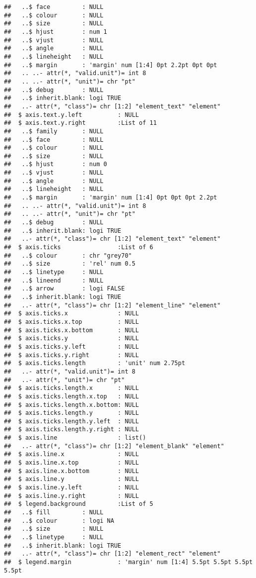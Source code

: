 \documentclass[]{article}
\begin{document}
\begin{verbatim}
##   ..$ face         : NULL
##   ..$ colour       : NULL
##   ..$ size         : NULL
##   ..$ hjust        : num 1
##   ..$ vjust        : NULL
##   ..$ angle        : NULL
##   ..$ lineheight   : NULL
##   ..$ margin       : 'margin' num [1:4] 0pt 2.2pt 0pt 0pt
##   .. ..- attr(*, "valid.unit")= int 8
##   .. ..- attr(*, "unit")= chr "pt"
##   ..$ debug        : NULL
##   ..$ inherit.blank: logi TRUE
##   ..- attr(*, "class")= chr [1:2] "element_text" "element"
##  $ axis.text.y.left          : NULL
##  $ axis.text.y.right         :List of 11
##   ..$ family       : NULL
##   ..$ face         : NULL
##   ..$ colour       : NULL
##   ..$ size         : NULL
##   ..$ hjust        : num 0
##   ..$ vjust        : NULL
##   ..$ angle        : NULL
##   ..$ lineheight   : NULL
##   ..$ margin       : 'margin' num [1:4] 0pt 0pt 0pt 2.2pt
##   .. ..- attr(*, "valid.unit")= int 8
##   .. ..- attr(*, "unit")= chr "pt"
##   ..$ debug        : NULL
##   ..$ inherit.blank: logi TRUE
##   ..- attr(*, "class")= chr [1:2] "element_text" "element"
##  $ axis.ticks                :List of 6
##   ..$ colour       : chr "grey70"
##   ..$ size         : 'rel' num 0.5
##   ..$ linetype     : NULL
##   ..$ lineend      : NULL
##   ..$ arrow        : logi FALSE
##   ..$ inherit.blank: logi TRUE
##   ..- attr(*, "class")= chr [1:2] "element_line" "element"
##  $ axis.ticks.x              : NULL
##  $ axis.ticks.x.top          : NULL
##  $ axis.ticks.x.bottom       : NULL
##  $ axis.ticks.y              : NULL
##  $ axis.ticks.y.left         : NULL
##  $ axis.ticks.y.right        : NULL
##  $ axis.ticks.length         : 'unit' num 2.75pt
##   ..- attr(*, "valid.unit")= int 8
##   ..- attr(*, "unit")= chr "pt"
##  $ axis.ticks.length.x       : NULL
##  $ axis.ticks.length.x.top   : NULL
##  $ axis.ticks.length.x.bottom: NULL
##  $ axis.ticks.length.y       : NULL
##  $ axis.ticks.length.y.left  : NULL
##  $ axis.ticks.length.y.right : NULL
##  $ axis.line                 : list()
##   ..- attr(*, "class")= chr [1:2] "element_blank" "element"
##  $ axis.line.x               : NULL
##  $ axis.line.x.top           : NULL
##  $ axis.line.x.bottom        : NULL
##  $ axis.line.y               : NULL
##  $ axis.line.y.left          : NULL
##  $ axis.line.y.right         : NULL
##  $ legend.background         :List of 5
##   ..$ fill         : NULL
##   ..$ colour       : logi NA
##   ..$ size         : NULL
##   ..$ linetype     : NULL
##   ..$ inherit.blank: logi TRUE
##   ..- attr(*, "class")= chr [1:2] "element_rect" "element"
##  $ legend.margin             : 'margin' num [1:4] 5.5pt 5.5pt 5.5pt 5.5pt

\end{verbatim}
\end{document}
